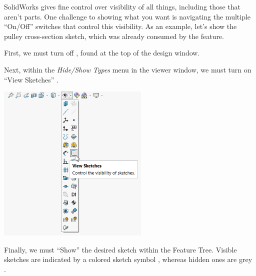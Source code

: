 \pagebreak

\begin{aside}
\label{box:all_types}

SolidWorks gives fine control over visibility of all things, including those that aren't
parts. One challenge to showing what you want is navigating the multiple ``On/Off'' switches that control
this visibility. As an example, let's show the pulley cross-section sketch,
which was already consumed by the  feature.

First, we must turn off , found at the top of the
design window.

Next, within the \emph{Hide/Show Types} menu in the viewer window, we must turn on
``View Sketches'' .

\begin{center}
\includegraphics[height=3in]{images/figures/hide-show-menu.png}
\end{center}

Finally, we must ``Show''  the
desired sketch within the Feature Tree. Visible sketches are indicated by a
colored sketch symbol , whereas hidden ones are grey
.

\end{aside}
